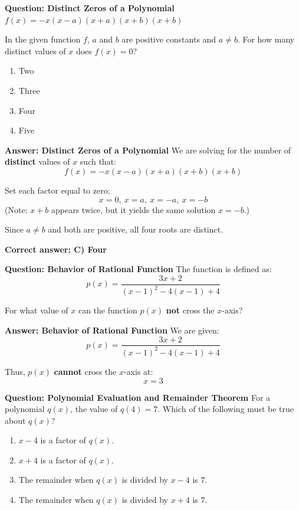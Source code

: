\documentclass{beamer}
\begin{document}
\begin{frame}{\textbf{Question: Distinct Zeros of a Polynomial}}
$f(x) = -x(x - a)(x + a)(x + b)(x + b)$

In the given function $f$, $a$ and $b$ are positive constants and $a \ne b$.  
For how many distinct values of $x$ does $f(x) = 0$?
\vspace{1em}

\begin{enumerate}
\item[A] Two
\item[B] Three
\item[C] Four
\item[D] Five
\end{enumerate}
\end{frame}

\begin{frame}{\textbf{Answer: Distinct Zeros of a Polynomial}}
We are solving for the number of \textbf{distinct} values of $x$ such that:
\[
f(x) = -x(x - a)(x + a)(x + b)(x + b)
\]

Set each factor equal to zero:
\[
x = 0,\ x = a,\ x = -a,\ x = -b
\]
(Note: $x + b$ appears twice, but it yields the same solution $x = -b$.)

Since $a \ne b$ and both are positive, all four roots are distinct.

\bigskip
\textbf{Correct answer: C) Four}
\end{frame}


\begin{frame}{\textbf{Question: Behavior of Rational Function}}
The function is defined as:
\[
p(x) = \frac{3x + 2}{(x - 1)^2 - 4(x - 1) + 4}
\]

For what value of $x$ can the function $p(x)$ \textbf{not} cross the $x$-axis?
\end{frame}


\begin{frame}{\textbf{Answer: Behavior of Rational Function}}
We are given:
\[
p(x) = \frac{3x + 2}{(x - 1)^2 - 4(x - 1) + 4}
\]



Thus, $p(x)$ \textbf{cannot} cross the $x$-axis at:
\[
\boxed{x = 3}
\]
\end{frame}


\begin{frame}{\textbf{Question: Polynomial Evaluation and Remainder Theorem}}
For a polynomial $q(x)$, the value of $q(4) = 7$.  
Which of the following must be true about $q(x)$?
\vspace{1em}

\begin{enumerate}
\item[A] $x - 4$ is a factor of $q(x)$.
\item[B] $x + 4$ is a factor of $q(x)$.
\item[C] The remainder when $q(x)$ is divided by $x - 4$ is $7$.
\item[D] The remainder when $q(x)$ is divided by $x + 4$ is $7$.
\end{enumerate}
\end{frame}
\end{document}
